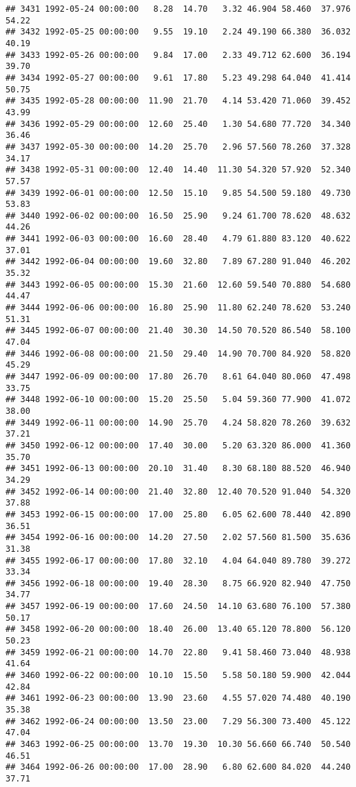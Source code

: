 \documentclass{article}\usepackage{graphicx, color}
\makeatletter
\newenvironment{kframe}{%
 \def\at@end@of@kframe{}%
 \ifinner\ifhmode%
  \def\at@end@of@kframe{\end{minipage}}%
  \begin{minipage}{\columnwidth}%
 \fi\fi%
 \def\FrameCommand##1{\hskip\@totalleftmargin \hskip-\fboxsep
 \colorbox{shadecolor}{##1}\hskip-\fboxsep
     \hskip-\linewidth \hskip-\@totalleftmargin \hskip\columnwidth}%
 \MakeFramed {\advance\hsize-\width
   \@totalleftmargin\z@ \linewidth\hsize
   \@setminipage}}%
 {\par\unskip\endMakeFramed%
 \at@end@of@kframe}
\newenvironment{knitrout}{}{} %
\makeatother
\begin{document}
\begin{knitrout}
\begin{kframe}
\begin{verbatim}
## 3431 1992-05-24 00:00:00   8.28  14.70   3.32 46.904 58.460  37.976  54.22
## 3432 1992-05-25 00:00:00   9.55  19.10   2.24 49.190 66.380  36.032  40.19
## 3433 1992-05-26 00:00:00   9.84  17.00   2.33 49.712 62.600  36.194  39.70
## 3434 1992-05-27 00:00:00   9.61  17.80   5.23 49.298 64.040  41.414  50.75
## 3435 1992-05-28 00:00:00  11.90  21.70   4.14 53.420 71.060  39.452  43.99
## 3436 1992-05-29 00:00:00  12.60  25.40   1.30 54.680 77.720  34.340  36.46
## 3437 1992-05-30 00:00:00  14.20  25.70   2.96 57.560 78.260  37.328  34.17
## 3438 1992-05-31 00:00:00  12.40  14.40  11.30 54.320 57.920  52.340  57.57
## 3439 1992-06-01 00:00:00  12.50  15.10   9.85 54.500 59.180  49.730  53.83
## 3440 1992-06-02 00:00:00  16.50  25.90   9.24 61.700 78.620  48.632  44.26
## 3441 1992-06-03 00:00:00  16.60  28.40   4.79 61.880 83.120  40.622  37.01
## 3442 1992-06-04 00:00:00  19.60  32.80   7.89 67.280 91.040  46.202  35.32
## 3443 1992-06-05 00:00:00  15.30  21.60  12.60 59.540 70.880  54.680  44.47
## 3444 1992-06-06 00:00:00  16.80  25.90  11.80 62.240 78.620  53.240  51.31
## 3445 1992-06-07 00:00:00  21.40  30.30  14.50 70.520 86.540  58.100  47.04
## 3446 1992-06-08 00:00:00  21.50  29.40  14.90 70.700 84.920  58.820  45.29
## 3447 1992-06-09 00:00:00  17.80  26.70   8.61 64.040 80.060  47.498  33.75
## 3448 1992-06-10 00:00:00  15.20  25.50   5.04 59.360 77.900  41.072  38.00
## 3449 1992-06-11 00:00:00  14.90  25.70   4.24 58.820 78.260  39.632  37.21
## 3450 1992-06-12 00:00:00  17.40  30.00   5.20 63.320 86.000  41.360  35.70
## 3451 1992-06-13 00:00:00  20.10  31.40   8.30 68.180 88.520  46.940  34.29
## 3452 1992-06-14 00:00:00  21.40  32.80  12.40 70.520 91.040  54.320  37.88
## 3453 1992-06-15 00:00:00  17.00  25.80   6.05 62.600 78.440  42.890  36.51
## 3454 1992-06-16 00:00:00  14.20  27.50   2.02 57.560 81.500  35.636  31.38
## 3455 1992-06-17 00:00:00  17.80  32.10   4.04 64.040 89.780  39.272  33.34
## 3456 1992-06-18 00:00:00  19.40  28.30   8.75 66.920 82.940  47.750  34.77
## 3457 1992-06-19 00:00:00  17.60  24.50  14.10 63.680 76.100  57.380  50.17
## 3458 1992-06-20 00:00:00  18.40  26.00  13.40 65.120 78.800  56.120  50.23
## 3459 1992-06-21 00:00:00  14.70  22.80   9.41 58.460 73.040  48.938  41.64
## 3460 1992-06-22 00:00:00  10.10  15.50   5.58 50.180 59.900  42.044  42.84
## 3461 1992-06-23 00:00:00  13.90  23.60   4.55 57.020 74.480  40.190  35.38
## 3462 1992-06-24 00:00:00  13.50  23.00   7.29 56.300 73.400  45.122  47.04
## 3463 1992-06-25 00:00:00  13.70  19.30  10.30 56.660 66.740  50.540  46.51
## 3464 1992-06-26 00:00:00  17.00  28.90   6.80 62.600 84.020  44.240  37.71

\end{verbatim}
\end{kframe}
\end{knitrout}
\end{document}
